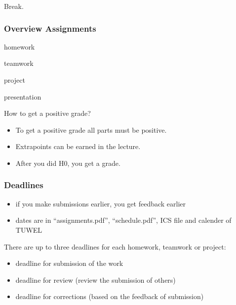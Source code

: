 \begin{assignment}
	\begin{task}
	Break.
	\end{task}
\end{assignment}

\begin{frame}
	\frametitle{Overview Assignments}
	\begin{description}[<+-| alert@+>]
	\item[30\,\%:] homework
	\item[30\,\%:] teamwork
	\item[40\,\%:] project
	\item[0\,\%:] presentation
	\end{description}

	\pause[\thebeamerpauses]

	\begin{quest}
	How to get a positive grade?
	\end{quest}

	\pause

	\begin{itemize}[<+-| alert@+>]
	\item To get a positive grade all parts must be positive.
	\item Extrapoints can be earned in the lecture.
	\item After you did H0, you get a grade.
	\end{itemize}
\end{frame}

\begin{frame}
	\frametitle{Deadlines}

	\begin{itemize}[<+-| alert@+>]
	\item if you make submissions earlier, you get feedback earlier
	\item dates are in ``assignments.pdf'', ``schedule.pdf'', ICS file and calender of TUWEL
	\end{itemize}

	\pause[\thebeamerpauses]
	\vspace{1em}

	There are up to three deadlines for each homework, teamwork or project:

	\begin{itemize}[<+-| alert@+>]
	\item deadline for submission of the work
	\item deadline for review (review the submission of others)
	\item deadline for corrections (based on the feedback of submission)
	\end{itemize}
\end{frame}

